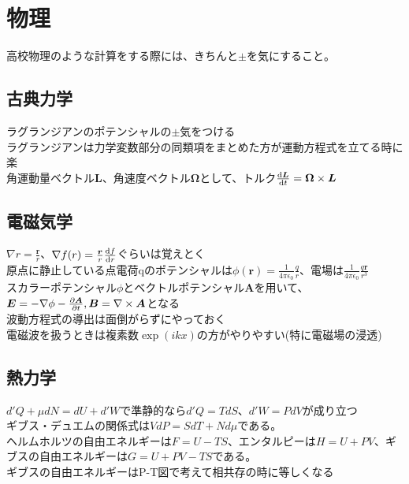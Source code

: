 \documentclass{ltjsarticle}
\begin{document}
  \section{物理}
  高校物理のような計算をする際には、きちんと$\pm$を気にすること。\\
  \subsection{古典力学}
  ラグランジアンのポテンシャルの$\pm$気をつける\\
  ラグランジアンは力学変数部分の同類項をまとめた方が運動方程式を立てる時に楽\\
  角運動量ベクトル$\bm{L}$、角速度ベクトル$\bm{\Omega}$として、トルク$\dv{\bm{L}}{t}=\bm{\Omega}\times\bm{L}$

  \subsection{電磁気学}
  $\nabla r=\frac{\bm{r}}{r}$、$\nabla f(r)=\frac{\bm{r}}{r}\dv{f}{r}$ぐらいは覚えとく\\
  原点に静止している点電荷qのポテンシャルは$\phi(\bm{r})=\frac{1}{4\pi\epsilon_0}\frac{q}{r}$、電場は$\frac{1}{4\pi\epsilon_0}\frac{q\bm{r}}{r^3}$\\
  スカラーポテンシャル$\phi$とベクトルポテンシャル$\bm{A}$を用いて、$\bm{E}=-\nabla\phi-\pdv{\bm{A}}{t},\bm{B}=\nabla\times \bm{A}$となる\\
  波動方程式の導出は面倒がらずにやっておく\\
  電磁波を扱うときは複素数$\exp(ikx)$の方がやりやすい(特に電磁場の浸透)\\
  \subsection{熱力学}
  $d'Q+\mu dN=dU+d'W$で準静的なら$d'Q=TdS$、$d'W=PdV$が成り立つ\\
  ギブス・デュエムの関係式は$VdP=SdT+Nd\mu$である。\\
  ヘルムホルツの自由エネルギーは$F=U-TS$、エンタルピーは$H=U+PV$、ギブスの自由エネルギーは$G=U+PV-TS$である。\\
  ギブスの自由エネルギーはP-T図で考えて相共存の時に等しくなる\\
\end{document}
